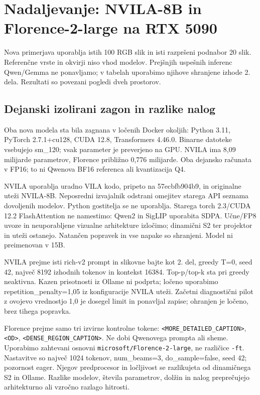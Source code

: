\documentclass[10pt,a4paper]{article}
\begin{document}
\newpage
\section*{Nadaljevanje: NVILA-8B in Florence-2-large na RTX 5090}
Nova primerjava uporablja istih 100 RGB slik in isti razpršeni podnabor 20 slik. Referenčne vrste in okvirji niso vhod modelov. Prejšnjih uspešnih inferenc Qwen/Gemma ne ponavljamo; v tabelah uporabimo njihove shranjene izhode 2. dela. Rezultati so povezani pogledi dveh prostorov.
\subsection*{Dejanski izolirani zagon in razlike nalog}
Oba nova modela sta bila zagnana v ločenih Docker okoljih: Python 3.11, PyTorch 2.7.1+cu128, CUDA 12.8, Transformers 4.46.0. Binarne datoteke vsebujejo sm\_120; vsak parameter je preverjeno na GPU. NVILA ima 8,09 milijarde parametrov, Florence približno 0,776 milijarde. Oba dejansko računata v FP16; to ni Qwenova BF16 referenca ali kvantizacija Q4.

NVILA uporablja uradno VILA kodo, pripeto na 57ecbfb904b9, in originalne uteži NVILA-8B. Neposredni izvajalnik odstrani omejitev starega API seznama dovoljenih modelov. Python gostitelja se ne uporablja. Starega torch 2.3/CUDA 12.2 FlashAttention ne namestimo: Qwen2 in SigLIP uporabita SDPA. Učne/FP8 uvoze in neuporabljene vizualne arhitekture izločimo; dinamični S2 ter projektor in uteži ostanejo. Natančen popravek in vse napake so shranjeni. Model ni preimenovan v 15B.

NVILA prejme isti rich-v2 prompt in slikovne bajte kot 2. del, greedy T=0, seed 42, največ 8192 izhodnih tokenov in kontekst 16384. Top-p/top-k sta pri greedy neaktivna. Kazen prisotnosti iz Ollame ni podprta; ločeno uporabimo repetition\_penalty=1,05 iz konfiguracije NVILA uteži. Začetni diagnostični pilot z ovojevo vrednostjo 1,0 je dosegel limit in ponavljal zapise; ohranjen je ločeno, brez tihega popravka.

Florence prejme samo tri izvirne kontrolne tokene: \texttt{<MORE\_DETAILED\_CAPTION>}, \texttt{<OD>}, \texttt{<DENSE\_REGION\_CAPTION>}. Ne dobi Qwenovega prompta ali sheme. Uporabimo zahtevani osnovni \texttt{microsoft/Florence-2-large}, ne različice \texttt{-ft}. Nastavitve so največ 1024 tokenov, num\_beams=3, do\_sample=false, seed 42; pozornost eager. Njegov predprocesor in ločljivost se razlikujeta od dinamičnega S2 in Ollame. Razlike modelov, števila parametrov, dolžin in nalog preprečujejo arhitekturno ali vzročno razlago hitrosti.
\end{document}
